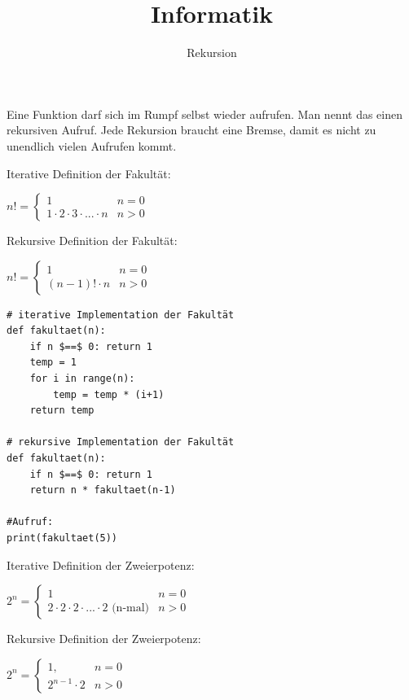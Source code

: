 \documentclass{beamer}
\begin{document}
\title{Informatik}   
\author{Rekursion} 
\date{}
\frame{\titlepage} 

\begin{frame}[fragile]
Eine Funktion darf sich im Rumpf selbst wieder aufrufen. 
Man nennt das einen rekursiven Aufruf. \pause Jede Rekursion braucht eine Bremse,
 damit es nicht zu unendlich vielen Aufrufen kommt. \pause 

Iterative Definition der Fakultät: \pause

$n! =\begin{cases}
 1   &  n = 0 \\
 1 \cdot 2 \cdot 3 \cdot ... \cdot n & n > 0 
\end{cases} $ \pause 

Rekursive Definition der Fakultät: 

$n! =\begin{cases}
 1   & n = 0 \\ 
 (n-1)! \cdot n & n > 0 
\end{cases} $
\end{frame}


\begin{frame}[fragile]
\begin{lstlisting} 
# iterative Implementation der Fakultät
def fakultaet(n):
    if n $==$ 0: return 1
    temp = 1
    for i in range(n):
        temp = temp * (i+1)
    return temp

# rekursive Implementation der Fakultät
def fakultaet(n):
    if n $==$ 0: return 1
    return n * fakultaet(n-1)
    
#Aufruf:
print(fakultaet(5))
\end{lstlisting} 
\end{frame}


\begin{frame}[fragile]

Iterative Definition der Zweierpotenz:

$2^n =\begin{cases}
 1   &  n = 0 \\
 2 \cdot 2 \cdot 2 \cdot ... \cdot 2 \text{  (n-mal)} & n > 0 
\end{cases} $ \pause

Rekursive Definition der Zweierpotenz:

$2^n =\begin{cases}
 1,   & n = 0 \\
 2^{n-1} \cdot 2 & n > 0 
\end{cases} $
\end{frame}
\end{document}

